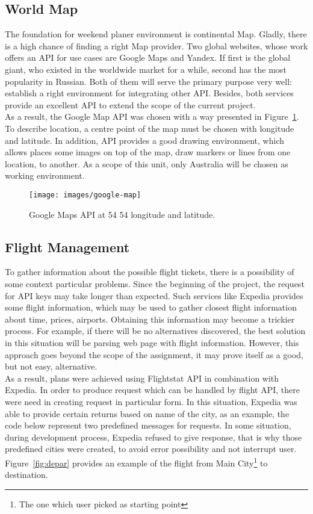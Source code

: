 \documentclass[12pt]{article}
\numberwithin{equation}{section} %
\numberwithin{figure}{section} %
\numberwithin{table}{section} %
\begin{document}
	\subsection{World Map}
		The foundation for weekend planer environment is continental Map. Gladly, there is a high chance of finding a right Map provider. Two global websites, whose work offers an API for use cases are Google Maps and Yandex. If first is the global giant, who existed in the worldwide market for a while, second has the most popularity in Russian. Both of them will serve the primary purpose very well: establish a right environment for integrating other API. Besides, both services provide an excellent API to extend the scope of the current project. \\
		
		As a result, the Google Map API was chosen with a way presented in Figure~\ref{fig:gmaps}. To describe location, a centre point of the map must be chosen with longitude and latitude. In addition, API provides a good drawing environment, which allows places some images on top of the map, draw markers or lines from one location, to another. As a scope of this unit, only Australia will be chosen as working environment.
		
		\begin{figure}[H]
			\centering        
			\texttt{[image: images/google-map]}
			\caption{Google Maps API at 54 54 longitude and latitude.}
			\label{fig:gmaps}
		\end{figure}
		
	\subsection{Flight Management}
		To gather information about the possible flight tickets, there is a possibility of some context particular problems. Since the beginning of the project, the request for API keys may take longer than expected. Such services like Expedia provides some flight information, which may be used to gather closest flight information about time, prices, airports. Obtaining this information may become a trickier process. For example, if there will be no alternatives discovered, the best solution in this situation will be parsing web page with flight information. However, this approach goes beyond the scope of the assignment, it may prove itself as a good, but not easy, alternative.\\
		
		As a result, plans were achieved using Flightstat API in combination with Expedia. In order to produce request which can be handled by flight API, there were need in creating request in particular form. In this situation, Expedia was able to provide certain returns based on name of the city, as an example, the code below represent two predefined messages for requests. In some situation, during development process, Expedia refused  to give response, that is why those predefined cities were created, to avoid error possibility and not interrupt user. Figure~\ref{fig:depar} provides an example of the flight from Main City\footnote{The one which user picked as starting point} to destination.
		
\end{document}
